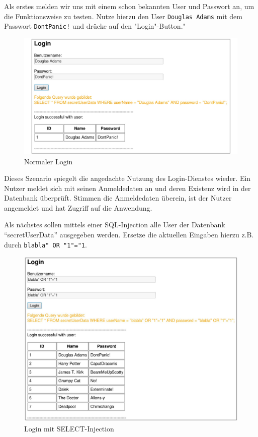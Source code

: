 Als erstes melden wir uns mit einem schon bekannten User und Passwort an, um die Funktionsweise zu testen. Nutze hierzu den User \colorbox{altgray}{\lstinline|Douglas Adams|} mit dem Passwort \colorbox{altgray}{\lstinline|DontPanic!|} und drücke auf den "Login"-Button."

\begin{figure}[H]
	\centering
	\includegraphics[width=\textwidth]{images/SQL_Injection/normal_login.jpg}
	\caption{Normaler Login}
	\label{fig:normal_login}
\end{figure}

Dieses Szenario spiegelt die angedachte Nutzung des Login-Dienstes wieder. Ein Nutzer meldet sich mit seinen Anmeldedaten an und deren Existenz wird in der Datenbank überprüft. Stimmen die Anmeldedaten überein, ist der Nutzer angemeldet und hat Zugriff auf die Anwendung.

Als nächstes sollen mittels einer SQL-Injection alle User der Datenbank \enquote{secretUserData} ausgegeben werden. Ersetze die aktuellen Eingaben hierzu z.B. durch \colorbox{altgray}{\lstinline|blabla" OR "1"="1|}. 

\begin{figure}[H]
	\centering
	\includegraphics[width=\textwidth]{images/SQL_Injection/select_injection.jpg}
	\caption{Login mit SELECT-Injection}
	\label{fig:select_injection}
\end{figure}

